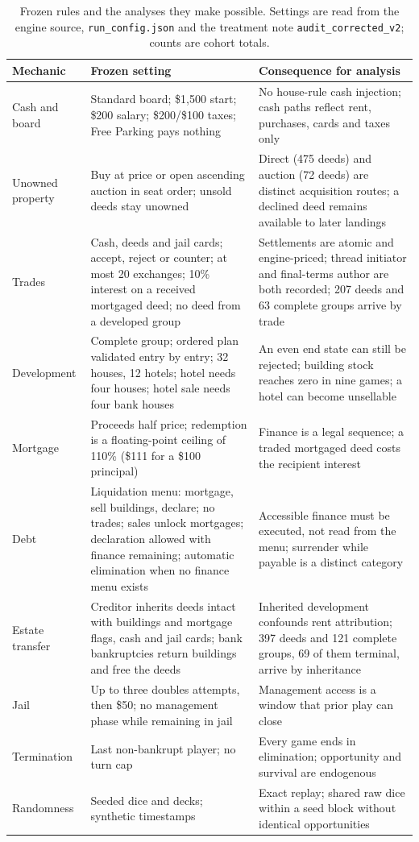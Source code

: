 \begin{table}[t]
\centering\footnotesize
\caption{Frozen rules and the analyses they make possible. Settings are read from the engine source, \texttt{run\_config.json} and the treatment note \texttt{audit\_corrected\_v2}; counts are cohort totals.}
\label{tab:rules}
\begin{tabularx}{\textwidth}{L{2.6cm} Y Y}
\toprule
Mechanic & Frozen setting & Consequence for analysis \\
\midrule
Cash and board & Standard board; \$1,500 start; \$200 salary; \$200/\$100 taxes; Free Parking pays nothing & No house-rule cash injection; cash paths reflect rent, purchases, cards and taxes only \\
Unowned property & Buy at price or open ascending auction in seat order; unsold deeds stay unowned & Direct (475 deeds) and auction (72 deeds) are distinct acquisition routes; a declined deed remains available to later landings \\
Trades & Cash, deeds and jail cards; accept, reject or counter; at most 20 exchanges; 10\% interest on a received mortgaged deed; no deed from a developed group & Settlements are atomic and engine-priced; thread initiator and final-terms author are both recorded; 207 deeds and 63 complete groups arrive by trade \\
Development & Complete group; ordered plan validated entry by entry; 32 houses, 12 hotels; hotel needs four houses; hotel sale needs four bank houses & An even end state can still be rejected; building stock reaches zero in nine games; a hotel can become unsellable \\
Mortgage & Proceeds half price; redemption is a floating-point ceiling of 110\% (\$111 for a \$100 principal) & Finance is a legal sequence; a traded mortgaged deed costs the recipient interest \\
Debt & Liquidation menu: mortgage, sell buildings, declare; no trades; sales unlock mortgages; declaration allowed with finance remaining; automatic elimination when no finance menu exists & Accessible finance must be executed, not read from the menu; surrender while payable is a distinct category \\
Estate transfer & Creditor inherits deeds intact with buildings and mortgage flags, cash and jail cards; bank bankruptcies return buildings and free the deeds & Inherited development confounds rent attribution; 397 deeds and 121 complete groups, 69 of them terminal, arrive by inheritance \\
Jail & Up to three doubles attempts, then \$50; no management phase while remaining in jail & Management access is a window that prior play can close \\
Termination & Last non-bankrupt player; no turn cap & Every game ends in elimination; opportunity and survival are endogenous \\
Randomness & Seeded dice and decks; synthetic timestamps & Exact replay; shared raw dice within a seed block without identical opportunities \\
\bottomrule
\end{tabularx}
\end{table}

